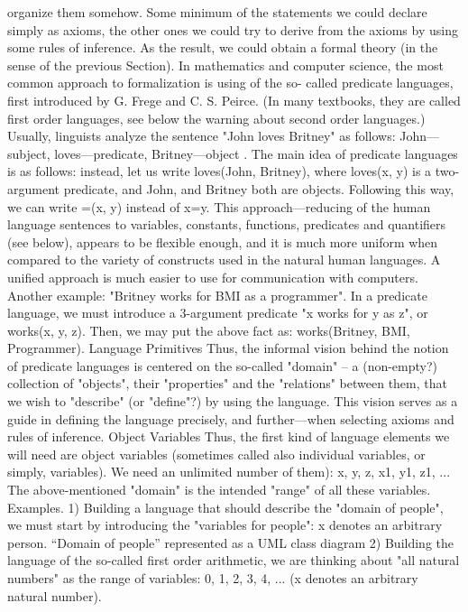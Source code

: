 organize them somehow. Some minimum of the statements we could declare simply as axioms, the other
ones we could try to derive from the axioms by using some rules of inference.
As the result, we could obtain a formal theory (in the sense of the previous Section).
In mathematics and computer science, the most common approach to formalization is using of the so-
called predicate languages, first introduced by G. Frege and C. S. Peirce.
(In many textbooks, they are called first order languages, see below the warning about second order languages.)
Usually, linguists analyze the sentence "John loves Britney" as follows: John---subject, loves---predicate,
Britney---object . The main idea of predicate languages is as follows: instead, let us write loves(John,
Britney), where loves(x, y) is a two-argument predicate, and John, and Britney both are objects. Following
this way, we can write =(x, y) instead of x=y. This approach---reducing of the human language sentences
to variables, constants, functions, predicates and quantifiers (see below), appears to be flexible enough,
and it is much more uniform when compared to the variety of constructs used in the natural human
languages. A unified approach is much easier to use for communication with computers.
Another example: "Britney works for BMI as a programmer". In a predicate language, we must introduce a 3-argument
predicate "x works for y as z", or works(x, y, z). Then, we may put the above fact as: works(Britney, BMI, Programmer).
Language Primitives
Thus, the informal vision behind the notion of predicate languages is centered on the so-called "domain"
– a (non-empty?) collection of "objects", their "properties" and the "relations" between them, that we wish
to "describe" (or "define"?) by using the language. This vision serves as a guide in defining the language
precisely, and further---when selecting axioms and rules of inference.
Object Variables
Thus, the first kind of language elements we will need are object variables (sometimes called also
individual variables, or simply, variables). We need an unlimited number of them):
x, y, z, x1, y1, z1, ...
The above-mentioned "domain" is the intended "range" of all these variables.
Examples. 1) Building a language that should describe the "domain of people", we must start by introducing the "variables for
people": x denotes an arbitrary person.
``Domain of people'' represented as a UML class diagram
2) Building the language of the so-called first order arithmetic, we are thinking about "all natural numbers" as the range of
variables: 0, 1, 2, 3, 4, ... (x denotes an arbitrary natural number).

